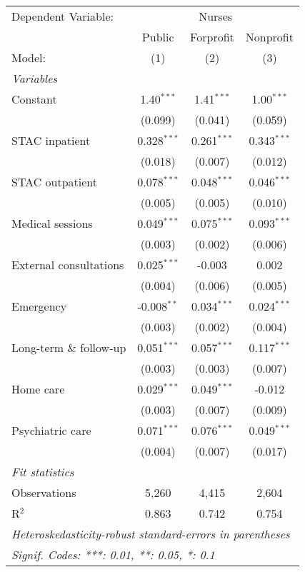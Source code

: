 
\begingroup
\centering
\begin{tabular}{lccc}
   \tabularnewline \midrule \midrule
   Dependent Variable: & \multicolumn{3}{c}{Nurses}\\
                           & Public        & Forprofit     & Nonprofit \\   
   Model:                  & (1)           & (2)           & (3)\\  
   \midrule
   \emph{Variables}\\
   Constant                & 1.40$^{***}$  & 1.41$^{***}$  & 1.00$^{***}$\\   
                           & (0.099)       & (0.041)       & (0.059)\\   
   STAC inpatient          & 0.328$^{***}$ & 0.261$^{***}$ & 0.343$^{***}$\\   
                           & (0.018)       & (0.007)       & (0.012)\\   
   STAC outpatient         & 0.078$^{***}$ & 0.048$^{***}$ & 0.046$^{***}$\\   
                           & (0.005)       & (0.005)       & (0.010)\\   
   Medical sessions        & 0.049$^{***}$ & 0.075$^{***}$ & 0.093$^{***}$\\   
                           & (0.003)       & (0.002)       & (0.006)\\   
   External consultations  & 0.025$^{***}$ & -0.003        & 0.002\\   
                           & (0.004)       & (0.006)       & (0.005)\\   
   Emergency               & -0.008$^{**}$ & 0.034$^{***}$ & 0.024$^{***}$\\   
                           & (0.003)       & (0.002)       & (0.004)\\   
   Long-term \& follow-up  & 0.051$^{***}$ & 0.057$^{***}$ & 0.117$^{***}$\\   
                           & (0.003)       & (0.003)       & (0.007)\\   
   Home care               & 0.029$^{***}$ & 0.049$^{***}$ & -0.012\\   
                           & (0.003)       & (0.007)       & (0.009)\\   
   Psychiatric care        & 0.071$^{***}$ & 0.076$^{***}$ & 0.049$^{***}$\\   
                           & (0.004)       & (0.007)       & (0.017)\\   
   \midrule
   \emph{Fit statistics}\\
   Observations            & 5,260         & 4,415         & 2,604\\  
   R$^2$                   & 0.863         & 0.742         & 0.754\\  
   \midrule \midrule
   \multicolumn{4}{l}{\emph{Heteroskedasticity-robust standard-errors in parentheses}}\\
   \multicolumn{4}{l}{\emph{Signif. Codes: ***: 0.01, **: 0.05, *: 0.1}}\\
\end{tabular}
\par\endgroup


